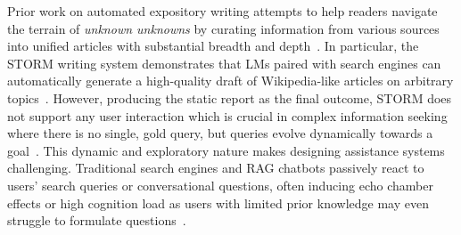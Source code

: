 Prior work on automated expository writing attempts to help readers  navigate the terrain of \textit{unknown unknowns} by curating information from various sources into unified articles with substantial breadth and depth~\citep{shen2023summarization}. %
In particular, the STORM writing system demonstrates that LMs paired with search engines can automatically generate a high-quality draft of Wikipedia-like articles on arbitrary topics~\citep{shao2024assisting}. However, producing the static report as the final outcome, STORM does not support any user interaction which is crucial in complex information seeking %
where there is no single, gold query, but queries evolve dynamically towards a goal~\citep{Bates1989TheDO}. This dynamic and exploratory nature makes designing assistance systems challenging. Traditional search engines and RAG chatbots passively react to users' search queries or conversational questions, often inducing echo chamber effects \citep{sharma2024generative} or high cognition load as users with limited prior knowledge may even struggle to formulate questions~\citep{kuhlthau1991inside,belkin1982ask}.




